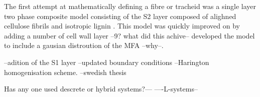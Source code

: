  The first attempt at mathematically defining a fibre or tracheid was a single layer two phase composite model consisting of the S2 layer composed of alighned cellulose fibrils and isotropic lignin \cite{Barber_1964}. This model was quickly improved on by \cite{mark1967cell} adding a number of cell wall layer --9? what did this achive-- \cite{Cave_1968} developed the model to include a gausian distroution of the MFA --why--. 
 
 --adition of the S1 layer
 --updated boundary conditions
 --Harington homogenisation scheme. 
 --swedish thesis
 
Has any one used descrete or hybrid systems?---
----L-systems--